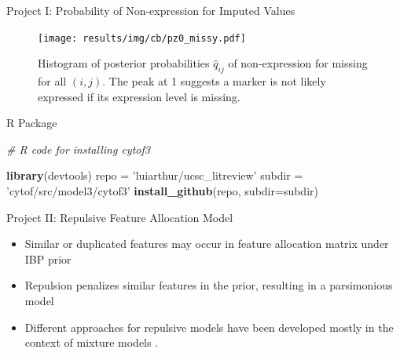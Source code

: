 \documentclass[ignorenonframetext,]{beamer}
\newenvironment{Shaded}{}{}
\newcommand{\KeywordTok}[1]{\textcolor[rgb]{0.00,0.44,0.13}{\textbf{{#1}}}}
\newcommand{\DataTypeTok}[1]{\textcolor[rgb]{0.56,0.13,0.00}{{#1}}}
\newcommand{\StringTok}[1]{\textcolor[rgb]{0.25,0.44,0.63}{{#1}}}
\newcommand{\CommentTok}[1]{\textcolor[rgb]{0.38,0.63,0.69}{\textit{{#1}}}}
\newcommand{\NormalTok}[1]{{#1}}
\begin{document}
\begin{frame}{Project I: Probability of Non-expression for Imputed Values}
\begin{figure}
\begin{center}
  \texttt{[image: results/img/cb/pz0\_missy.pdf]}
  \caption{Histogram of posterior probabilities $\hat{q}_{ij}$ of
  non-expression for missing for all $(i,j)$.  The peak at 1 suggests 
  a marker is not likely expressed if its expression level is
  missing.}
\end{center}
\end{figure}
\end{frame}


\begin{frame}[fragile]{R Package}
\begin{Shaded}
\begin{Highlighting}[]
\CommentTok{# R code for installing cytof3}

\KeywordTok{library}\NormalTok{(devtools)}
\NormalTok{repo =}\StringTok{ 'luiarthur/ucsc_litreview'}
\NormalTok{subdir =}\StringTok{ 'cytof/src/model3/cytof3'}
\KeywordTok{install_github}\NormalTok{(repo, }\DataTypeTok{subdir=}\NormalTok{subdir)}
\end{Highlighting}
\end{Shaded}
\end{frame}




\begin{frame}{Project II: Repulsive Feature Allocation Model}
  \begin{itemize}
    \setlength\itemsep{1em}
    \item Similar or duplicated features may occur in feature allocation matrix under IBP prior
    \item Repulsion penalizes similar features in the prior, resulting in a parsimonious model
    \item Different approaches for repulsive models have been developed mostly
    in the context of mixture models \citep{petralia2012repulsive,
    quinlan2017parsimonious, xie2017bayesian, quinlan2017density}. 
  \end{itemize}
\end{frame}
\end{document}
